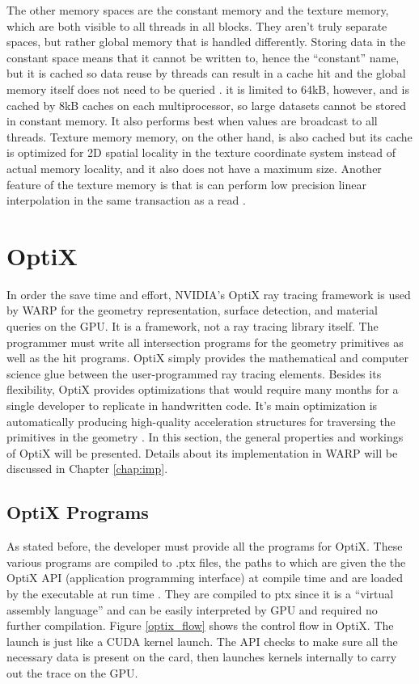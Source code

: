 The other memory spaces are the constant memory and the texture memory, which are both visible to all threads in all blocks.  They aren't truly separate spaces, but rather global memory that is handled differently.  Storing data in the constant space means that it cannot be written to, hence the ``constant'' name, but it is cached so data reuse by threads can result in a cache hit and the global memory itself does not need to be queried \cite{cuda}.  it is limited to 64kB, however, and is cached by 8kB caches on each multiprocessor, so large datasets cannot be stored in constant memory.  It also performs best when values are broadcast to all threads.  Texture memory memory, on the other hand, is also cached but its cache is optimized for 2D spatial locality in the texture coordinate system instead of actual memory locality, and it also does not have a maximum size.  Another feature of the texture memory is that is can perform low precision linear interpolation in the same transaction as a read \cite{cuda}.

\section{OptiX}

In order the save time and effort, NVIDIA's OptiX ray tracing framework is used by WARP for the geometry representation, surface detection, and material queries on the GPU.  It is a framework, not a ray tracing library itself.  The programmer must write all intersection programs for the geometry primitives as well as the hit programs.  OptiX simply provides the mathematical and computer science glue between the user-programmed ray tracing elements.  Besides its flexibility, OptiX provides optimizations that would require many months for a single developer to replicate in handwritten code.  It's main optimization is automatically producing high-quality acceleration structures for traversing the primitives in the geometry \cite{optix}.  In this section, the general properties and workings of OptiX will be presented.  Details about its implementation in WARP will be discussed in Chapter \ref{chap:imp}.

\subsection{OptiX Programs}

As stated before, the developer must provide all the programs for OptiX.  These various programs are compiled to .ptx files, the paths to which are given the the OptiX API (application programming interface) at compile time and are loaded by the executable at run time \cite{optix}.  They are compiled to ptx since it is a ``virtual assembly language'' and can be easily interpreted by GPU and required no further compilation.  Figure \ref{optix_flow} shows the control flow in OptiX.  The launch is just like a CUDA kernel launch.  The API checks to make sure all the necessary data is present on the card, then launches kernels internally to carry out the trace on the GPU.

